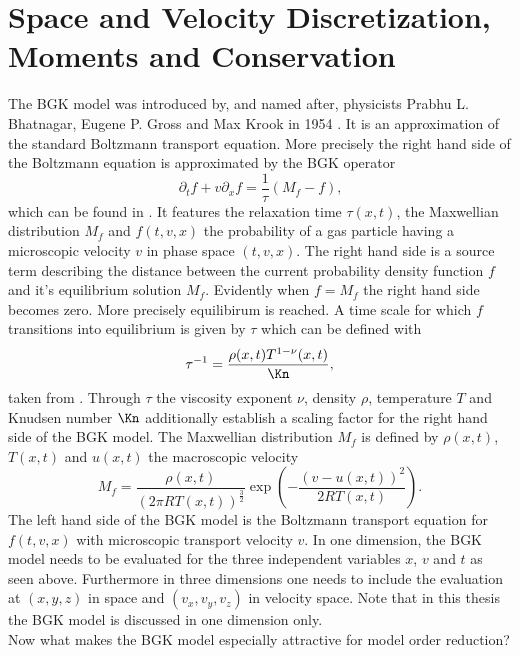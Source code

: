 \section{Space and Velocity Discretization, Moments and Conservation}
The BGK model was introduced by, and named after, physicists Prabhu L. Bhatnagar, Eugene P. Gross and Max Krook in 1954 \cite{BGK}. It is an approximation of the standard Boltzmann transport equation. More precisely the right hand side of the Boltzmann equation is approximated by the BGK operator 
\begin{equation}
\partial_t f + v \partial_x f = \frac{1}{\tau} (M_f - f) \text{,}
\label{Eq:BGK}
\end{equation}
which can be found in \cite{puppo2019kinetic}. It features the relaxation time \(\tau(x,t)\), the Maxwellian distribution \(M_f\) and \(f(t,v,x)\) the probability of a gas particle having a microscopic velocity \(v\) in phase space \((t,v,x)\). The right hand side is a source term describing the distance between the current probability density function \(f\) and it's equilibrium solution \(M_f\). Evidently when \(f = M_f\) the right hand side becomes zero. More precisely equilibirum is reached. A time scale for which \(f\) transitions into equilibrium is given by \(\tau\) which can be defined with
\begin{equation}
	\tau^{-1} = \frac{\rho(x,t)T^{1-\nu}(x,t)}{\Kn}\mathrm{,}
\end{equation}
taken from \cite{Bernard}. Through \(\tau\) the viscosity exponent \(\nu\), density \(\rho\), temperature \(T\) and Knudsen number \(\Kn\) additionally establish a scaling factor for the right hand side of the BGK model. The Maxwellian distribution \(M_f\) is defined by \(\rho(x,t)\), \(T(x,t)\) and \(u(x,t)\) the macroscopic velocity
\begin{equation}
M_f = \frac{\rho(x,t)}{(2\pi R T(x,t))^{\frac{3}{2}}}\exp(-\frac{(v - u(x,t))^2}{2 R T(x,t)}) \text{.}
\end{equation} 
The left hand side of the BGK model is the Boltzmann transport equation for \(f(t,v,x)\) with microscopic transport velocity \(v\).
In one dimension, the BGK model needs to be evaluated for the three independent variables \(x\), \(v\) and \(t\) as seen above. Furthermore in three dimensions one needs to include the evaluation at \((x,y,z)\) in space and \((v_x,v_y,v_z)\) in velocity space. Note that in this thesis the BGK model is discussed in one dimension only.\\ 
Now what makes the BGK model especially attractive for model order reduction?
